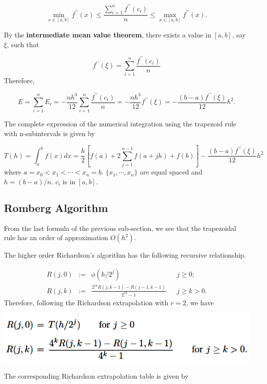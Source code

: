 \documentclass[
]{book}
\begin{document}
\[
\min_{x\in[a,b]} f^{\prime\prime}(x) \le \frac{\sum_{i=1}^nf^{\prime\prime}(c_i)}{n} \le \max_{x\in[a,b]} f^{\prime\prime}(x).
\]

By the \textbf{intermediate mean value theorem}, there exists a value in \([a, b]\), say \(\xi\), such that

\[
f^{\prime\prime}(\xi) = \sum_{i=1}^n \frac{f^{\prime\prime}(c_i)}{n}
\]
Therefore,

\[
E = \sum_{i=1}^nE_i = -\frac{nh^3}{12}\sum_{i=1}^n\frac{f^{\prime\prime}(c_i)}{n} = - \frac{nh^3}{12}f^{\prime\prime}(\xi) = -\frac{(b-a)f^{\prime\prime}(\xi)}{12}h^2.
\]

The complete expression of the numerical integration using the trapezoid rule with n-subintervals is given by

\[
T(h) = \int_a^bf(x)dx = \frac{h}{2}\left[f(a) + 2\sum_{j=1}^{n-1}f(a + jh) + f(b) \right] -\frac{(b-a)f^{\prime\prime}(\xi)}{12}h^2
\]
where \(a = x_0 < x_1 < \cdots < x_n = b\). \(\{ x_1, \cdots, x_n\}\) are equal spaced and \(h = (b-a)/n\). \(c_i\) is in \([a, b]\).

\hfill\break

\hypertarget{romberg-algorithm}{%
\subsection{Romberg Algorithm}\label{romberg-algorithm}}

From the last formula of the previous sub-section, we see that the trapezoidal rule has an order of approximation \(O(h^2)\).

The higher order Richardson's algorithm has the following recursive relationship.

\[
\begin{array}{lclcl}
 R(j, 0) & := & \phi(h/2^j) &  & j \ge 0;  \\ 
 R(j, k) & := & \frac{2^{rk}R(j, k-1)-R(j-1, k-1)}{2^{rk}-1}  &   & j \ge k > 0.  
\end{array}
\]
Therefore, following the Richardson extrapolation with \(r=2\), we have

\begin{center}\includegraphics[width=0.55\linewidth]{img13/w13-RombergMethodAlgorithm} \end{center}

The corresponding Richardson extrapolation table is given by
\end{document}
